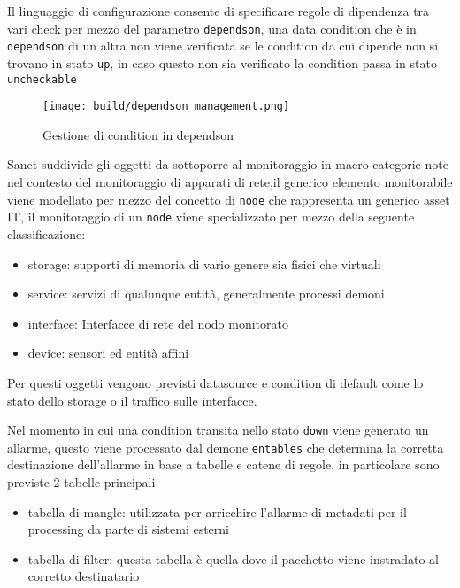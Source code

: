 Il linguaggio di configurazione consente di specificare regole di dipendenza tra vari check per mezzo del parametro \verb|dependson|, una data condition che è in \verb|dependson| di un altra non viene verificata se le condition da cui dipende non si trovano in stato \verb|up|, in caso questo non sia verificato la condition passa in stato \verb|uncheckable|

\begin{figure}[H]
    \centering
    \texttt{[image: build/dependson\_management.png]}
    \caption{Gestione di condition in dependson}
    \label{fig:enter-label}
\end{figure}

Sanet suddivide gli oggetti da sottoporre al monitoraggio in macro categorie note nel contesto del monitoraggio di apparati di rete,il generico elemento monitorabile viene modellato per mezzo del concetto di \verb|node| che rappresenta un generico asset IT, il monitoraggio di un \verb|node| viene specializzato per mezzo della seguente classificazione:

\begin{itemize}
  \item storage: supporti di memoria di vario genere sia fisici che virtuali
  \item service: servizi di qualunque entità, generalmente processi demoni
  \item interface: Interfacce di rete del nodo monitorato
  \item device: sensori ed entità affini
\end{itemize}

Per questi oggetti vengono previsti datasource e condition di default come lo stato dello storage o il traffico sulle interfacce.

Nel momento in cui una condition transita nello stato \verb|down| viene generato un allarme, questo viene processato dal demone \verb|entables| che determina la corretta destinazione dell'allarme in base a tabelle e catene di regole, in particolare sono previste 2 tabelle principali

\begin{itemize}
  \item tabella di mangle: utilizzata per arricchire l'allarme di metadati per il processing da parte di sistemi esterni
  \item tabella di filter: questa tabella è quella dove il pacchetto viene instradato al corretto destinatario
\end{itemize}

